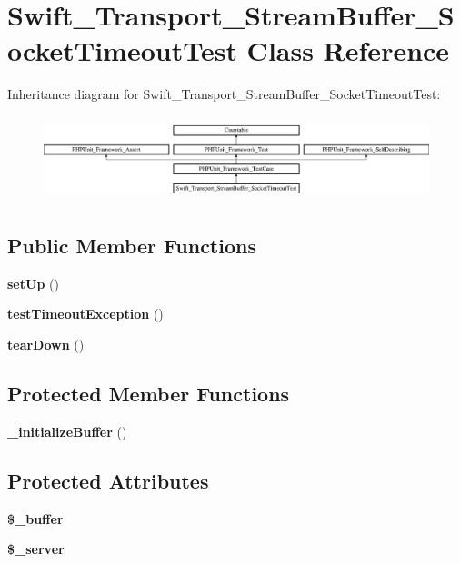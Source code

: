 \section{Swift\+\_\+\+Transport\+\_\+\+Stream\+Buffer\+\_\+\+Socket\+Timeout\+Test Class Reference}
\label{class_swift___transport___stream_buffer___socket_timeout_test}
Inheritance diagram for Swift\+\_\+\+Transport\+\_\+\+Stream\+Buffer\+\_\+\+Socket\+Timeout\+Test\+:\begin{figure}[H]
\begin{center}
\leavevmode
\includegraphics[height=2.488889cm]{class_swift___transport___stream_buffer___socket_timeout_test}
\end{center}
\end{figure}
\subsection*{Public Member Functions}
\begin{DoxyCompactItemize}
\item 
{\bf set\+Up} ()
\item 
{\bf test\+Timeout\+Exception} ()
\item 
{\bf tear\+Down} ()
\end{DoxyCompactItemize}
\subsection*{Protected Member Functions}
\begin{DoxyCompactItemize}
\item 
{\bf \+\_\+initialize\+Buffer} ()
\end{DoxyCompactItemize}
\subsection*{Protected Attributes}
\begin{DoxyCompactItemize}
\item 
{\bf \$\+\_\+buffer}
\item 
{\bf \$\+\_\+server}
\end{DoxyCompactItemize}

